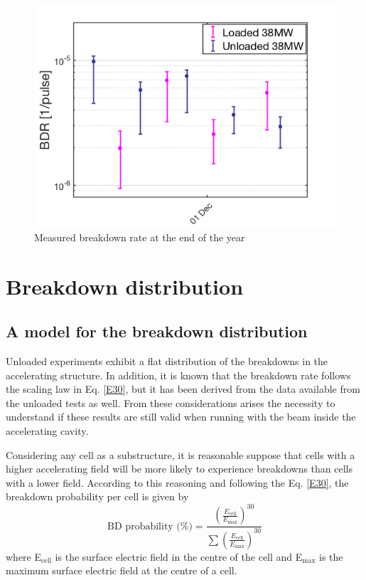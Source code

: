 \begin{figure}[h]
\centering 
\includegraphics[scale=0.6]{pictures/BDR_last_part_year.png}
\caption{Measured breakdown rate at the end of the year}
\label{BD_prob_last_raise}
\end{figure}





\section[Breakdown distribution]{Breakdown distribution}

\subsection[A model for the breakdown distribution]{A model for the breakdown distribution}

Unloaded experiments exhibit a flat distribution of the breakdowns in the accelerating structure. In addition, it is known that the breakdown rate follows the scaling law in Eq. \ref{E30}, but it has been derived from the data available from the unloaded tests as well. From these considerations arises the necessity to understand if these results are still valid when running with the beam inside the accelerating cavity.

Considering any cell as a substructure, it is reasonable suppose that cells with a higher accelerating field will be more likely to experience breakdowns than cells with a lower field. According to this reasoning and following the Eq. \ref{E30}, the breakdown probability per cell is given by
\begin{equation}
\text{BD probability (\%)} =\frac{   \left ( \frac{E_\text{cell}}{E_\text{max}} \right )^{30} }{ \sum \left( \frac{E_\text{cell}}{E_\text{max}} \right )^{30}   }
\end{equation}
where E$_\text{cell}$ is the surface electric field in the centre of the cell and E$_\text{max}$ is the maximum surface electric field at the centre of a cell. 

